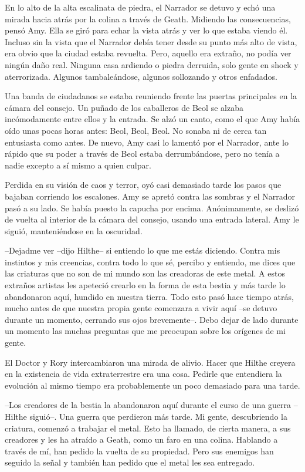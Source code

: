 {En lo alto de la alta escalinata de piedra, el Narrador se detuvo y
	echó una mirada hacia atrás por la colina a través de Geath. Midiendo
	las consecuencias, pensó Amy. Ella se giró para echar la vista atrás y
	ver lo que estaba viendo él. Incluso sin la vista que el Narrador debía
	tener desde su punto más alto de vista, era obvio que la ciudad estaba
	revuelta. Pero, aquello era extraño, no podía ver ningún daño real.
	Ninguna casa ardiendo o piedra derruida, solo gente en shock y
	aterrorizada. Algunos tambaleándose, algunos sollozando y otros
enfadados.}

{Una banda de ciudadanos se estaba reuniendo frente las puertas
	principales en la cámara del consejo. Un puñado de los caballeros de
	Beol se alzaba incómodamente entre ellos y la entrada. Se alzó un canto,
	como el que Amy había oído unas pocas horas antes: Beol, Beol, Beol. No
	sonaba ni de cerca tan entusiasta como antes. De nuevo, Amy casi lo
	lamentó por el Narrador, ante lo rápido que su poder a través de Beol
	estaba derrumbándose, pero no tenía a nadie excepto a sí mismo a quien
culpar.}

{Perdida en su visión de caos y terror, oyó casi demasiado tarde los
	pasos que bajaban corriendo los escalones. Amy se apretó contra las
	sombras y el Narrador pasó a su lado. Se había puesto la capucha por
	encima. Anónimamente, se deslizó de vuelta al interior de la cámara del
	consejo, usando una entrada lateral. Amy le siguió, manteniéndose en la
oscuridad.}

\mbox{}

{--Dejadme ver --dijo Hilthe-- si entiendo lo que me estás diciendo.
	Contra mis instintos y mis creencias, contra todo lo que sé, percibo y
	entiendo, me dices que las criaturas que no son de mi mundo son las
	creadoras de este metal. A estos extraños artistas les apeteció crearlo
	en la forma de esta bestia y más tarde lo abandonaron aquí, hundido en
	nuestra tierra. Todo esto pasó hace tiempo atrás, mucho antes de que
	nuestra propia gente comenzara a vivir aquí --se detuvo durante un
	momento, cerrando sus ojos brevemente--. Debo dejar de lado durante un
	momento las muchas preguntas que me preocupan sobre los orígenes de mi
gente.}

{El Doctor y Rory intercambiaron una mirada de alivio. Hacer que Hilthe
	creyera en la existencia de vida extraterrestre era una cosa. Pedirle
	que entendiera la evolución al mismo tiempo era probablemente un poco
demasiado para una tarde.}

{--Los creadores de la bestia la abandonaron aquí durante el curso de
	una guerra --Hilthe siguió--. Una guerra que perdieron más tarde. Mi
	gente, descubriendo la criatura, comenzó a trabajar el metal. Esto ha
	llamado, de cierta manera, a sus creadores y les ha atraído a Geath,
	como un faro en una colina. Hablando a través de mí, han pedido la
	vuelta de su propiedad. Pero sus enemigos han seguido la señal y también
han pedido que el metal les sea entregado.}

